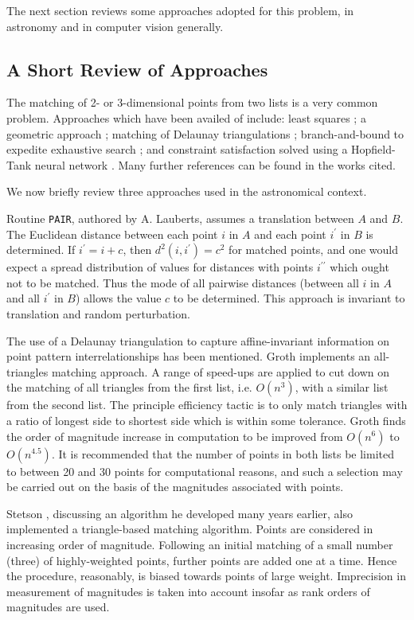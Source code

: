 The next section reviews some approaches adopted for this problem, in 
astronomy and in computer vision generally.

\subsection{A Short Review of Approaches}

The matching of 2- or 3-dimensional points from two lists is a very common
problem.  Approaches which have been availed of include: least squares
\cite{ume}; a geometric approach \cite{griff}; 
matching of Delaunay triangulations \cite{oga1}; branch-and-bound to 
expedite exhaustive search \cite{won}; and constraint satisfaction
solved using a Hopfield-Tank neural network \cite{par}.
Many further references can be found in
the works cited.

We now briefly review three approaches used in the astronomical context.

Routine {\tt PAIR}, authored by A. Lauberts, assumes a translation between
$A$ and $B$.  The Euclidean distance between each point $i$ in $A$ and each
point $i^{\prime}$ in $B$ is determined.  If $i^{\prime} = i + c$, then
$d^2(i,i^{\prime}) = c^2$ for matched points, and one would expect a 
spread distribution of values for distances with points $i^{\prime\prime}$ 
which ought
not to be matched.  Thus the mode of all pairwise distances (between all $i$ in
$A$ and all $i^{\prime}$ in $B$) allows the value $c$ to be determined.  This
approach is invariant to translation and random perturbation.  

The use of a Delaunay triangulation to capture affine-invariant information
on point pattern interrelationships has been mentioned.  
Groth \cite{gro} implements an all-triangles matching approach.  A range of
speed-ups are applied to cut down on the matching of all triangles from
the first list, i.e. $O(n^3)$, with a similar list from the second list.
The principle efficiency tactic is to only match triangles with a 
ratio of longest side to shortest side which is within some tolerance.  
Groth finds the order of magnitude increase in computation to be improved
from $O(n^6)$ to $O(n^{4.5})$.  It is recommended that the number of points
in both lists be limited to between 20 and 30 points for computational reasons,
and such a selection may be carried out on the basis of the magnitudes 
associated with points.

Stetson \cite{ste}, discussing an algorithm he developed many years earlier,
also implemented a triangle-based matching algorithm.  Points
are considered in increasing order of magnitude.  Following an initial 
matching of a small number (three) of highly-weighted points, further points 
are added one at a time.  Hence the procedure, reasonably, is biased towards  
points of large weight.  Imprecision in measurement of magnitudes is taken 
into account insofar as rank orders of magnitudes are used.

